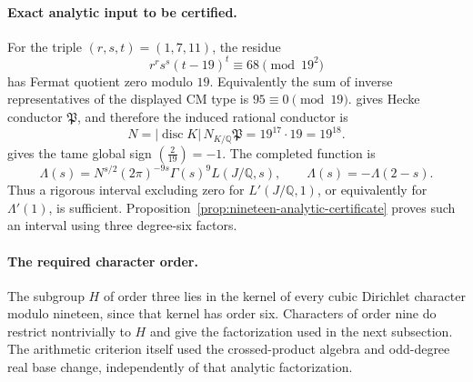 \paragraph{Exact analytic input to be certified.}
For the triple $(r,s,t)=(1,7,11)$, the residue
\[
 r^r s^s(t-19)^t\equiv68\pmod {19^2}
\]
has Fermat quotient zero modulo $19$.  Equivalently the
sum of inverse representatives of the displayed CM type
is $95\equiv0\pmod {19}$.  \citet[Proposition~3.12(1), author p.~16]{ShuExpanded2021} gives
Hecke conductor $\mathfrak P$, and therefore the induced
rational conductor is
\[
 N=|\operatorname{disc}K|\,N_{K/\mathbb Q}\mathfrak P
   =19^{17}\cdot19=19^{18}.
\]
\citet[Theorem~3.13, author pp.~17--18]{ShuExpanded2021} gives the tame global sign
$\left(\frac2{19}\right)=-1$.
The completed function is
\[
 \Lambda(s)=N^{s/2}(2\pi)^{-9s}\Gamma(s)^9L(J/\mathbb Q,s),
 \qquad \Lambda(s)=-\Lambda(2-s).
\]
Thus a rigorous interval excluding zero for
$L'(J/\mathbb Q,1)$, or equivalently for $\Lambda'(1)$,
is sufficient. Proposition~\ref{prop:nineteen-analytic-certificate}
proves such an interval using three degree-six factors.

\paragraph{The required character order.}
The subgroup $H$ of order three lies in the kernel of every
cubic Dirichlet character modulo nineteen, since that kernel
has order six.  Characters of order nine do restrict nontrivially to $H$
and give the factorization used in the next subsection. The arithmetic
criterion itself used the crossed-product algebra and odd-degree
real base change, independently of that analytic factorization.

